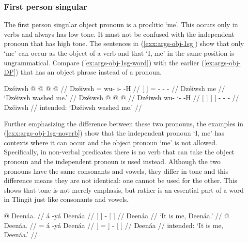 \subsubsection{First person singular}\label{sec:args-obj-prons-1sg}

The first person singular object pronoun is a proclitic  ‘me’. This occurs only in verbs and always has low tone. It must not be confused with the independent pronoun  that has high tone. The sentences in (\ref{exx:args-obj-1sg}) show that only  ‘me’ can occur as the object of a verb and that  ‘I, me’ in the same position is ungrammatical. Compare (\ref{ex:args-obj-1sg-word}) with the earlier (\ref{ex:args-obj-DP}) that has an object phrase instead of a pronoun.

\pex\label{exx:args-obj-1sg}%
\a\label{ex:args-obj-1sg-procl}%
%
\begingl
	\gla	{} Dzéiwsh {}  @  @ {} @ {} @ {} //
	\glb	{} Dzéiwsh {} = wu- i-  -H //
	\glc	{}[  {}] = - -  - //
	\gld	{} Dzéiwsh {} me  {} {} {} //
	\glft	‘Dzéiwsh washed me.’
		//
\endgl
\a\label{ex:args-obj-1sg-word}%
\ljudge{*}%
%
\begingl
	\gla	{} Dzéiwsh {} {}  {}  @ {} @ {} @ {} //
	\glb	{} Dzéiwsh {} {}  {} wu- i-  -H //
	\glc	{}[  {}] {}[  {}] - -  - //
	\gld	{} Dzéiwsh {} {}  {}  {} {} {} //
	\glft	intended: ‘Dzéiwsh washed me.’
		//
\endgl
\xe

Further emphasizing the difference between these two pronouns, the examples in (\ref{exx:args-obj-1sg-noverb}) show that the independent pronoun  ‘I, me’ has contexts where it can occur and the object pronoun  ‘me’ is not allowed. Specifically, in non-verbal predicates there is no verb that can take the object pronoun  and the independent pronoun  is used instead. Although the two pronouns have the same consonants and vowels, they differ in tone and this difference means they are not identical: one cannot be used for the other. This shows that tone is not merely emphasis, but rather is an essential part of a word in Tlingit just like consonants and vowels.

\pex\label{exx:args-obj-1sg-noverb}%
\a\label{ex:args-obj-1sg-noverb-indep}%
%
\begingl
	\gla	{}  {}  @ {} {} Deenáa. {} //
	\glb	{}  {} á -yá {} Deenáa {}  //
	\glc	{}[  {}]  - {}[  {}] //
	\gld	{}  {}  {} {} Deenáa {} //
	\glft	‘It is me, Deenáa.’
		//
\endgl
\a\label{ex:args-obj-1sg-noverb-procl}%
\ljudge{*}%
%
\begingl
	\gla	{}  {}  @ {} {} Deenáa. {} //
	\glb	{} = {} á -yá {} Deenáa {}  //
	\glc	{}[ = {}]  - {}[  {}] //
	\gld	{}  {}  {} {} Deenáa {} //
	\glft	intended: ‘It is me, Deenáa.’
		//
\endgl
\xe

